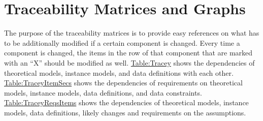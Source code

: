 \documentclass[12pt]{article}
\begin{document}
\section{Traceability Matrices and Graphs}
\label{Sec:TraceMatrices}
The purpose of the traceability matrices is to provide easy references on what has to be additionally modified if a certain component is changed. Every time a component is changed, the items in the row of that component that are marked with an ``X'' should be modified as well. \hyperref[Table:Tracey]{Table:Tracey} shows the dependencies of theoretical models, instance models, and data definitions with each other. \hyperref[Table:TraceyItemSecs]{Table:TraceyItemSecs} shows the dependencies of requirements on theoretical models, instance models, data definitions, and data constraints. \hyperref[Table:TraceyReqsItems]{Table:TraceyReqsItems} shows the dependencies of theoretical models, instance models, data definitions, likely changes and requirements on the assumptions.
\end{document}
